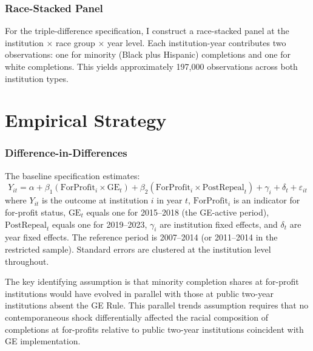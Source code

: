 \documentclass[12pt]{article}
\begin{document}
\subsubsection*{Race-Stacked Panel} For the triple-difference specification, I construct a race-stacked panel at the institution $\times$ race group $\times$ year level. Each institution-year contributes two observations: one for minority (Black plus Hispanic) completions and one for white completions. This yields approximately 197,000 observations across both institution types.




\section{Empirical Strategy}

\subsubsection*{Difference-in-Differences} The baseline specification estimates:
\begin{equation}
Y_{it} = \alpha + \beta_1 (\text{ForProfit}_i \times \text{GE}_{t}) + \beta_2 (\text{ForProfit}_i \times \text{PostRepeal}_{t}) + \gamma_i + \delta_t + \varepsilon_{it}
\label{eq:dd}
\end{equation}
where $Y_{it}$ is the outcome at institution $i$ in year $t$, $\text{ForProfit}_i$ is an indicator for for-profit status, $\text{GE}_t$ equals one for 2015--2018 (the GE-active period), $\text{PostRepeal}_t$ equals one for 2019--2023, $\gamma_i$ are institution fixed effects, and $\delta_t$ are year fixed effects. The reference period is 2007--2014 (or 2011--2014 in the restricted sample). Standard errors are clustered at the institution level throughout.

The key identifying assumption is that minority completion shares at for-profit institutions would have evolved in parallel with those at public two-year institutions absent the GE Rule. This parallel trends assumption requires that no contemporaneous shock differentially affected the racial composition of completions at for-profits relative to public two-year institutions coincident with GE implementation.
\end{document}
